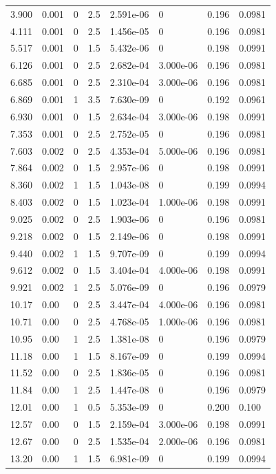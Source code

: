 \documentclass[preview]{standalone}
\begin{document}
{{\begin{tabular}{L{1.2cm}C{1.2cm} C{0.3cm}C{0.5cm} C{1.4cm}C{1.4cm} C{1.4cm}C{1.4cm}}
  3.900  &  0.001  & 0     & 2.5 &  2.591e-06  & 0  & 0.196 &  0.0981   \\ 
  4.111  &  0.001  & 0     & 2.5 &  1.456e-05  & 0  & 0.196 &  0.0981   \\ 
  5.517  &  0.001  & 0     & 1.5 &  5.432e-06  & 0  & 0.198 &  0.0991   \\ 
  6.126  &  0.001  & 0     & 2.5 &  2.682e-04  & 3.000e-06  & 0.196 &  0.0981   \\ 
  6.685  &  0.001  & 0     & 2.5 &  2.310e-04  & 3.000e-06  & 0.196 &  0.0981   \\ 
  6.869  &  0.001  & 1     & 3.5 &  7.630e-09  & 0  & 0.192 &  0.0961   \\ 
  6.930  &  0.001  & 0     & 1.5 &  2.634e-04  & 3.000e-06  & 0.198 &  0.0991   \\ 
  7.353  &  0.001  & 0     & 2.5 &  2.752e-05  & 0  & 0.196 &  0.0981   \\ 
  7.603  &  0.002  & 0     & 2.5 &  4.353e-04  & 5.000e-06  & 0.196 &  0.0981   \\ 
  7.864  &  0.002  & 0     & 1.5 &  2.957e-06  & 0  & 0.198 &  0.0991   \\ 
  8.360  &  0.002  & 1     & 1.5 &  1.043e-08  & 0  & 0.199 &  0.0994   \\ 
  8.403  &  0.002  & 0     & 1.5 &  1.023e-04  & 1.000e-06  & 0.198 &  0.0991   \\ 
  9.025  &  0.002  & 0     & 2.5 &  1.903e-06  & 0  & 0.196 &  0.0981   \\ 
  9.218  &  0.002  & 0     & 1.5 &  2.149e-06  & 0  & 0.198 &  0.0991   \\ 
  9.440  &  0.002  & 1     & 1.5 &  9.707e-09  & 0  & 0.199 &  0.0994   \\ 
  9.612  &  0.002  & 0     & 1.5 &  3.404e-04  & 4.000e-06  & 0.198 &  0.0991   \\ 
  9.921  &  0.002  & 1     & 2.5 &  5.076e-09  & 0  & 0.196 &  0.0979   \\ 
  10.17  &  0.00  & 0     & 2.5 &  3.447e-04  & 4.000e-06  & 0.196 &  0.0981   \\ 
  10.71  &  0.00  & 0     & 2.5 &  4.768e-05  & 1.000e-06  & 0.196 &  0.0981   \\ 
  10.95  &  0.00  & 1     & 2.5 &  1.381e-08  & 0  & 0.196 &  0.0979   \\ 
  11.18  &  0.00  & 1     & 1.5 &  8.167e-09  & 0  & 0.199 &  0.0994   \\ 
  11.52  &  0.00  & 0     & 2.5 &  1.836e-05  & 0  & 0.196 &  0.0981   \\ 
  11.84  &  0.00  & 1     & 2.5 &  1.447e-08  & 0  & 0.196 &  0.0979   \\ 
  12.01  &  0.00  & 1     & 0.5 &  5.353e-09  & 0  & 0.200 &  0.100   \\ 
  12.57  &  0.00  & 0     & 1.5 &  2.159e-04  & 3.000e-06  & 0.198 &  0.0991   \\ 
  12.67  &  0.00  & 0     & 2.5 &  1.535e-04  & 2.000e-06  & 0.196 &  0.0981   \\ 
  13.20  &  0.00  & 1     & 1.5 &  6.981e-09  & 0  & 0.199 &  0.0994   \\ 
\hline 
\end{tabular} 

}}
\end{document}

